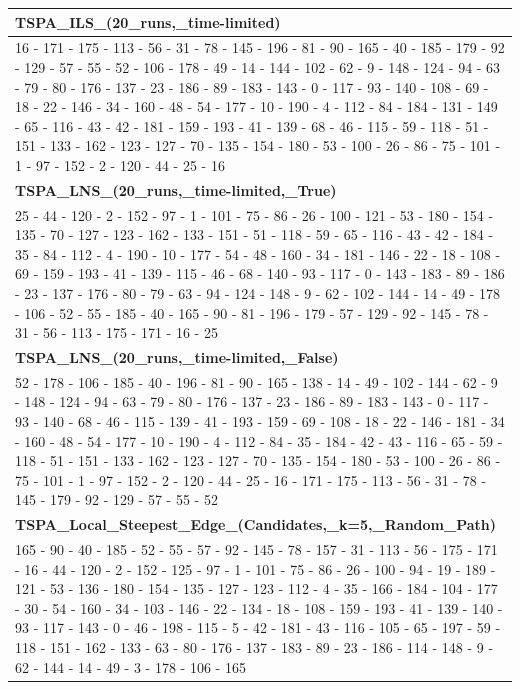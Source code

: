 \begin{table}[h!]
\begin{tabular}{|p{14cm}|}
\textbf{TSPA\_ILS\_(20\_runs,\_time-limited)} \\ \hline
16 - 171 - 175 - 113 - 56 - 31 - 78 - 145 - 196 - 81 - 90 - 165 - 40 - 185 - 179 - 92 - 129 - 57 - 55 - 52 - 106 - 178 - 49 - 14 - 144 - 102 - 62 - 9 - 148 - 124 - 94 - 63 - 79 - 80 - 176 - 137 - 23 - 186 - 89 - 183 - 143 - 0 - 117 - 93 - 140 - 108 - 69 - 18 - 22 - 146 - 34 - 160 - 48 - 54 - 177 - 10 - 190 - 4 - 112 - 84 - 184 - 131 - 149 - 65 - 116 - 43 - 42 - 181 - 159 - 193 - 41 - 139 - 68 - 46 - 115 - 59 - 118 - 51 - 151 - 133 - 162 - 123 - 127 - 70 - 135 - 154 - 180 - 53 - 100 - 26 - 86 - 75 - 101 - 1 - 97 - 152 - 2 - 120 - 44 - 25 - 16 \\ \hline
\textbf{TSPA\_LNS\_(20\_runs,\_time-limited,\_True)} \\ \hline
25 - 44 - 120 - 2 - 152 - 97 - 1 - 101 - 75 - 86 - 26 - 100 - 121 - 53 - 180 - 154 - 135 - 70 - 127 - 123 - 162 - 133 - 151 - 51 - 118 - 59 - 65 - 116 - 43 - 42 - 184 - 35 - 84 - 112 - 4 - 190 - 10 - 177 - 54 - 48 - 160 - 34 - 181 - 146 - 22 - 18 - 108 - 69 - 159 - 193 - 41 - 139 - 115 - 46 - 68 - 140 - 93 - 117 - 0 - 143 - 183 - 89 - 186 - 23 - 137 - 176 - 80 - 79 - 63 - 94 - 124 - 148 - 9 - 62 - 102 - 144 - 14 - 49 - 178 - 106 - 52 - 55 - 185 - 40 - 165 - 90 - 81 - 196 - 179 - 57 - 129 - 92 - 145 - 78 - 31 - 56 - 113 - 175 - 171 - 16 - 25 \\ \hline
\textbf{TSPA\_LNS\_(20\_runs,\_time-limited,\_False)} \\ \hline
52 - 178 - 106 - 185 - 40 - 196 - 81 - 90 - 165 - 138 - 14 - 49 - 102 - 144 - 62 - 9 - 148 - 124 - 94 - 63 - 79 - 80 - 176 - 137 - 23 - 186 - 89 - 183 - 143 - 0 - 117 - 93 - 140 - 68 - 46 - 115 - 139 - 41 - 193 - 159 - 69 - 108 - 18 - 22 - 146 - 181 - 34 - 160 - 48 - 54 - 177 - 10 - 190 - 4 - 112 - 84 - 35 - 184 - 42 - 43 - 116 - 65 - 59 - 118 - 51 - 151 - 133 - 162 - 123 - 127 - 70 - 135 - 154 - 180 - 53 - 100 - 26 - 86 - 75 - 101 - 1 - 97 - 152 - 2 - 120 - 44 - 25 - 16 - 171 - 175 - 113 - 56 - 31 - 78 - 145 - 179 - 92 - 129 - 57 - 55 - 52 \\ \hline
\textbf{TSPA\_Local\_Steepest\_Edge\_(Candidates,\_k=5,\_Random\_Path)} \\ \hline
165 - 90 - 40 - 185 - 52 - 55 - 57 - 92 - 145 - 78 - 157 - 31 - 113 - 56 - 175 - 171 - 16 - 44 - 120 - 2 - 152 - 125 - 97 - 1 - 101 - 75 - 86 - 26 - 100 - 94 - 19 - 189 - 121 - 53 - 136 - 180 - 154 - 135 - 127 - 123 - 112 - 4 - 35 - 166 - 184 - 104 - 177 - 30 - 54 - 160 - 34 - 103 - 146 - 22 - 134 - 18 - 108 - 159 - 193 - 41 - 139 - 140 - 93 - 117 - 143 - 0 - 46 - 198 - 115 - 5 - 42 - 181 - 43 - 116 - 105 - 65 - 197 - 59 - 118 - 151 - 162 - 133 - 63 - 80 - 176 - 137 - 183 - 89 - 23 - 186 - 114 - 148 - 9 - 62 - 144 - 14 - 49 - 3 - 178 - 106 - 165 \\ \hline

\end{tabular}
\end{table}
